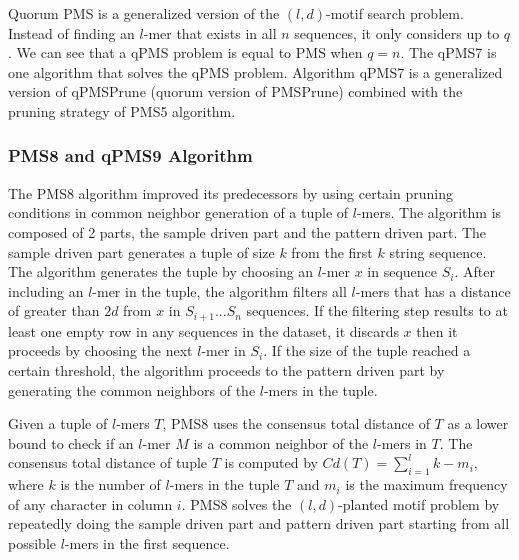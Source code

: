 Quorum PMS is a generalized version of the $(l, d)$-motif search problem. Instead of finding an $l$-mer that exists in all $n$ sequences, it only considers up to $q$. We can see that a qPMS problem is equal to PMS when $q = n$. The qPMS7 \cite{Dinh2012} is one algorithm that solves the qPMS problem. Algorithm qPMS7 is a generalized version of qPMSPrune (quorum version of PMSPrune) combined with the pruning strategy of PMS5 algorithm. 


\subsubsection{PMS8 and qPMS9 Algorithm}

The PMS8 \cite{pms2014} algorithm improved its predecessors by using certain pruning conditions in common neighbor generation of a tuple of $l$-mers. The algorithm is composed of 2 parts, the sample driven part and the pattern driven part. The sample driven part generates a tuple of size $k$ from the first $k$ string sequence. The algorithm generates the tuple by choosing an $l$-mer $x$ in sequence $S_i$. After including an $l$-mer in the tuple, the algorithm filters all $l$-mers that has a distance of greater than $2d$ from $x$ in $S_{i+1} ... S_n$ sequences. If the filtering step results to at least one empty row in any sequences in the dataset, it discards $x$ then it proceeds by choosing the next $l$-mer in $S_i$.
If the size of the tuple reached a certain threshold, the algorithm proceeds to the pattern driven part by generating the common neighbors of the $l$-mers in the tuple. 

Given a tuple of $l$-mers $T$, PMS8 uses the consensus total distance of $T$ as a lower bound to check if an $l$-mer $M$ is a common neighbor of the $l$-mers in $T$. The consensus total distance of tuple $T$ is computed by $Cd(T) = \sum_{i=1}^l k - m_i$, where $k$ is the number of $l$-mers in the tuple $T$ and $m_i$ is the maximum frequency of any character in column $i$. PMS8 solves the $(l, d)$-planted motif problem by repeatedly doing the sample driven part and pattern driven part starting from all possible $l$-mers in the first sequence.

